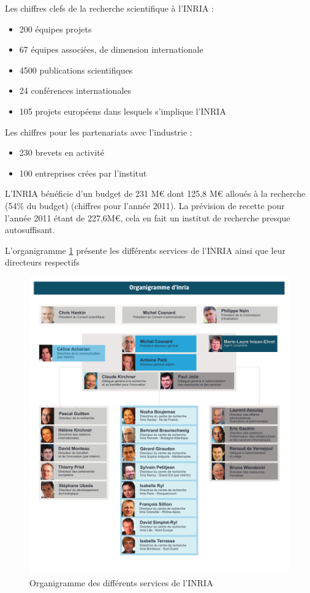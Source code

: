 \documentclass[a4paper, 11pt]{report}
\begin{document}
    Les chiffres clefs de la recherche scientifique à l'INRIA :
    \begin{itemize}
      \item 200 équipes projets
      \item 67 équipes associées, de dimension internationale
      \item 4500 publications scientifiques
      \item 24 conférences internationales
      \item 105 projets européens dans lesquels s'implique l'INRIA
    \end{itemize}

    Les chiffres pour les partenariats avec l'industrie :
    \begin{itemize}
      \item 230 brevets en activité
      \item 100 entreprises crées par l'institut
    \end{itemize}

    L'INRIA bénéficie d'un budget de 231 M\euro{} dont 125,8 M\euro{} alloués à la
    recherche (54\% du budget) (chiffres pour l'année 2011). La prévision
    de recette pour l'année 2011 étant de 227,6M\euro{}, cela en fait un institut
    de recherche presque autosuffisant.

    L'organigramme \cref{orga} présente les différents services de l'INRIA ainsi
    que leur directeurs respectifs
    \begin{figure}
    \includegraphics[scale=0.85]{data/organigrammeinria.pdf}
    \caption{Organigramme des différents services de l'INRIA}
    \label{orga}
    \end{figure}
\end{document}
